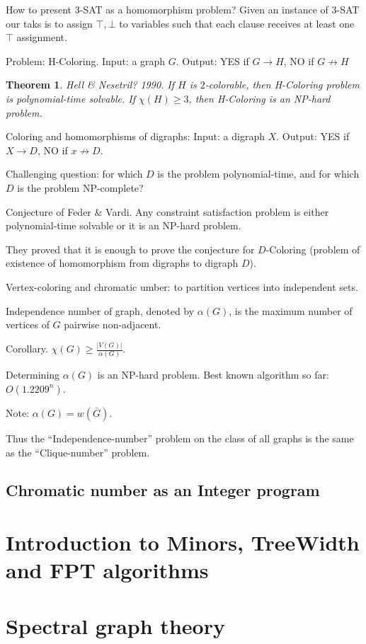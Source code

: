 \documentclass[12pt,a4paper]{article}
\newtheorem{theorem}{Theorem}
\begin{document}
How to present \(3\)-SAT as a homomorphism problem?  Given an instance of
\(3\)-SAT our taks is to assign \(\top, \bot\) to variables such that each
clause receives at least one \(\top\) assignment.

Problem: H-Coloring.
Input: a graph \(G\).
Output: YES if \(G \to H\), NO if \(G \not\to H\)

\begin{theorem}
  Hell \& Nesetril? 1990.  If \(H\) is \(2\)-colorable, then H-Coloring problem
  is polynomial-time solvable.  If \(\chi(H) \geq 3\), then H-Coloring is an
  NP-hard problem.
\end{theorem}

Coloring and homomorphisms of digraphs:
Input: a digraph \(X\).
Output: YES if \(X \to D\), NO if \(x \not\to D\).

Challenging question: for which \(D\) is the problem polynomial-time, and for
which \(D\) is the problem NP-complete?

Conjecture of Feder \& Vardi. Any constraint satisfaction problem is either
polynomial-time solvable or it is an NP-hard problem.

They proved that it is enough to prove the conjecture for \(D\)-Coloring
(problem of existence of homomorphism from digraphs to digraph \(D\)).

Vertex-coloring and chromatic umber: to partition vertices into independent
sets.

Independence number of graph, denoted by \(\alpha(G)\), is the maximum number of
vertices of \(G\) pairwise non-adjacent.

Corollary. \(\chi(G) \geq \frac{|V(G)|}{\alpha(G)}\).

Determining \(\alpha(G)\) is an NP-hard problem.  Best known algorithm so far:
\(O(1.2209^n)\).

Note: \(\alpha(G) = w(\bar{G})\).

Thus the \enquote{Independence-number} problem on the class of all graphs is the same as
the \enquote{Clique-number} problem.

\subsection{Chromatic number as an Integer program}

\section{Introduction to Minors, TreeWidth and FPT algorithms}
\section{Spectral graph theory}
\end{document}
